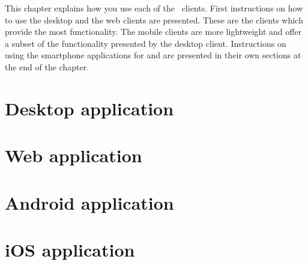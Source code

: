 

This chapter explains how you use each of the \appName\ clients. First instructions on how to use the desktop and the web clients are presented. These are the clients which provide the most functionality. The mobile clients are more lightweight and offer a subset of the functionality presented by the desktop client. Instructions on using the smartphone applications for  and  are presented in their own sections at the end of the chapter. 


\section{Desktop application}

\FloatBarrier

\section{Web application}

\FloatBarrier

\section{Android application}


\FloatBarrier

\section{iOS application}


\FloatBarrier
